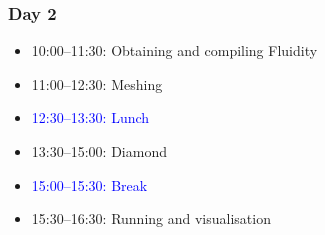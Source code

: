 
\begin{frame}
  \frametitle{Day 2}
  \begin{itemize}[]
  \item[] 10:00--11:30: Obtaining and compiling Fluidity
  \item[] 11:00--12:30: Meshing
  \item[] \textcolor{blue}{12:30--13:30: Lunch}
  \item[] 13:30--15:00: Diamond
  \item[] \textcolor{blue}{15:00--15:30: Break}
  \item[] 15:30--16:30: Running and visualisation
  \end{itemize}
\end{frame}
